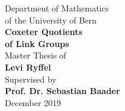 \begin{titlepage}
\begin{center}
\vspace*{0.75cm}
\Large{Department of Mathematics \\ of the University of Bern}\\
\vspace*{3cm}
\Huge{\textbf{Coxeter Quotients \\ of Link Groups}}\\
\vspace*{6.5cm}
\Large{Master Thesis of} \\ \Large{\textbf{Levi Ryffel}}\\
\vspace*{.25cm}
Supervised by \\ \textbf{Prof. Dr. Sebastian Baader}\\
\vspace*{2cm}
December 2019
\end{center}
\end{titlepage}
